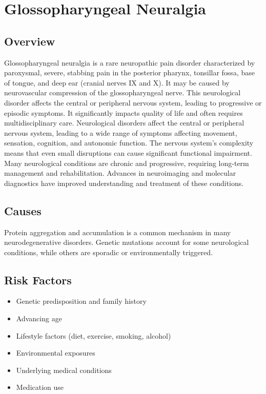 \chapter{Glossopharyngeal Neuralgia}
\label{sec:Glossopharyngeal Neuralgia}

\section{Overview}
Glossopharyngeal neuralgia is a rare neuropathic pain disorder characterized by paroxysmal, severe, stabbing pain in the posterior pharynx, tonsillar fossa, base of tongue, and deep ear (cranial nerves IX and X). It may be caused by neurovascular compression of the glossopharyngeal nerve. This neurological disorder affects the central or peripheral nervous system, leading to progressive or episodic symptoms. It significantly impacts quality of life and often requires multidisciplinary care. Neurological disorders affect the central or peripheral nervous system, leading to a wide range of symptoms affecting movement, sensation, cognition, and autonomic function. The nervous system's complexity means that even small disruptions can cause significant functional impairment. Many neurological conditions are chronic and progressive, requiring long-term management and rehabilitation. Advances in neuroimaging and molecular diagnostics have improved understanding and treatment of these conditions.
\section{Causes}
Protein aggregation and accumulation is a common mechanism in many neurodegenerative disorders.  Genetic mutations account for some neurological conditions, while others are sporadic or environmentally triggered.   
\section{Risk Factors}
\begin{itemize}[noitemsep]
  \item Genetic predisposition and family history
  \item Advancing age
  \item Lifestyle factors (diet, exercise, smoking, alcohol)
  \item Environmental exposures
  \item Underlying medical conditions
  \item Medication use
\end{itemize}
